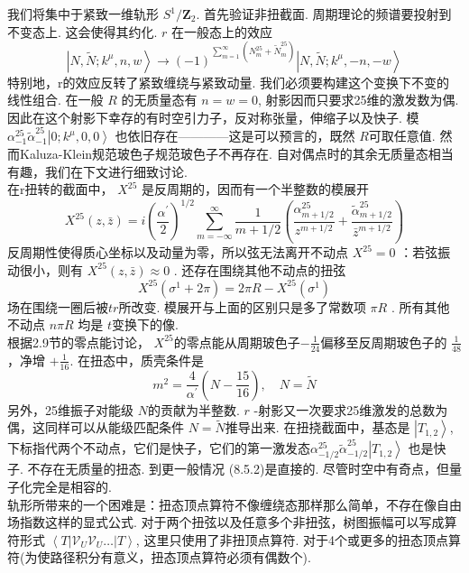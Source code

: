 我们将集中于紧致一维轨形 $S^{1} / \mathbf{Z}_{2}$. 首先验证非扭截面. 周期理论的频谱要投射到不变态上. 这会使得其约化. $r$ 在一般态上的效应
\begin{equation}
	\left|N, \tilde{N} ; k^{\mu}, n, w\right\rangle \rightarrow(-1)^{\sum_{m=1}^{\infty}\left(N_{m}^{25}+\tilde{N}_{m}^{25}\right)}\left|N, \tilde{N} ; k^{\mu},-n,-w\right\rangle
\end{equation}
特别地，r的效应反转了紧致缠绕与紧致动量. 我们必须要构建这个变换下不变的线性组合. 在一般 $R$ 的无质量态有 $n=w=0$, 射影因而只要求25维的激发数为偶. 因此在这个射影下幸存的有时空引力子，反对称张量，伸缩子以及快子. 模 $\alpha_{-1}^{25} \tilde{\alpha}_{-1}^{25}\left|0 ; k^{\mu}, 0,0\right\rangle$ 也依旧存在————这是可以预言的，既然 $R$可取任意值. 然而Kaluza-Klein规范玻色子规范玻色子不再存在. 自对偶点时的其余无质量态相当有趣，我们在下文进行细致讨论.\\
在r扭转的截面中， $X^{25}$ 是反周期的，因而有一个半整数的模展开
\begin{equation}
	X^{25}(z, \bar{z})=i\left(\frac{\alpha^{\prime}}{2}\right)^{1 / 2} \sum_{m=-\infty}^{\infty} \frac{1}{m+1 / 2}\left(\frac{\alpha_{m+1 / 2}^{25}}{z^{m+1 / 2}}+\frac{\tilde{\alpha}_{m+1 / 2}^{25}}{\bar{z}^{m+1 / 2}}\right)
\end{equation}
反周期性使得质心坐标以及动量为零，所以弦无法离开不动点 $X^{25}=0$ ：若弦振动很小，则有 $X^{25}(z, \bar{z}) \approx 0 $ . 还存在围绕其他不动点的扭弦
\begin{equation}
	X^{25}\left(\sigma^{1}+2 \pi\right)=2 \pi R-X^{25}\left(\sigma^{1}\right)
\end{equation}
场在围绕一圈后被$t r$所改变. 模展开与上面的区别只是多了常数项 $\pi R $ . 所有其他不动点 $n \pi R$ 均是 $t$变换下的像.\\
根据2.9节的零点能讨论， $X^{25}$的零点能从周期玻色子$-\frac{1}{24}$偏移至反周期玻色子的  $\frac{1}{48}$ ，净增 $+\frac{1}{16}$. 在扭态中，质壳条件是
\begin{equation}
	m^{2}=\frac{4}{\alpha^{\prime}}\left(N-\frac{15}{16}\right), \quad N=\tilde{N}
\end{equation}
另外，25维振子对能级 $N$的贡献为半整数.  $r$ -射影又一次要求25维激发的总数为偶，这同样可以从能级匹配条件 $N=\tilde{N}$推导出来. 在扭挠截面中，基态是 $\left|T_{1,2}\right\rangle$, 下标指代两个不动点，它们是快子，它们的第一激发态$\alpha_{-1 / 2}^{25} \tilde{\alpha}_{-1 / 2}^{25}\left|T_{1,2}\right\rangle $ 也是快子. 不存在无质量的扭态. 到更一般情况 (8.5.2)是直接的. 尽管时空中有奇点，但量子化完全是相容的.\\
轨形所带来的一个困难是：扭态顶点算符不像缠绕态那样那么简单，不存在像自由场指数这样的显式公式. 对于两个扭弦以及任意多个非扭弦，树图振幅可以写成算符形式 $\left\langle T\left|\mathscr{V}_{U} \mathscr{V}_{U} \ldots\right| T\right\rangle$, 这里只使用了非扭顶点算符. 对于4个或更多的扭态顶点算符(为使路径积分有意义，扭态顶点算符必须有偶数个).\\

